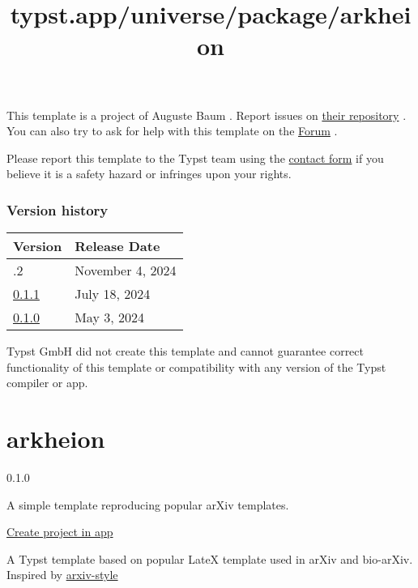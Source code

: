 This template is a project of Auguste Baum . Report issues on
\href{https://github.com/augustebaum/epfl-thesis-typst}{their
repository} . You can also try to ask for help with this template on the
\href{https://forum.typst.app}{Forum} .

Please report this template to the Typst team using the
\href{https://typst.app/contact}{contact form} if you believe it is a
safety hazard or infringes upon your rights.

\label{versions}
\subsubsection{Version history}\label{version-history}

\begin{longtable}[]{@{}ll@{}}
\toprule\noalign{}
Version & Release Date \\
\midrule\noalign{}
\endhead
\bottomrule\noalign{}
\endlastfoot
0.1.2 & November 4, 2024 \\
\href{https://typst.app/universe/package/scholarly-epfl-thesis/0.1.1/}{0.1.1}
& July 18, 2024 \\
\href{https://typst.app/universe/package/scholarly-epfl-thesis/0.1.0/}{0.1.0}
& May 3, 2024 \\
\end{longtable}

Typst GmbH did not create this template and cannot guarantee correct
functionality of this template or compatibility with any version of the
Typst compiler or app.


\title{typst.app/universe/package/arkheion}

\label{banner}
\label{template-thumbnail}

\section{arkheion}\label{arkheion}

{ 0.1.0 }

A simple template reproducing popular arXiv templates.

\href{/app?template=arkheion&version=0.1.0}{Create project in app}

\label{readme}
A Typst template based on popular LateX template used in arXiv and
bio-arXiv. Inspired by
\href{https://github.com/kourgeorge/arxiv-style}{arxiv-style}

